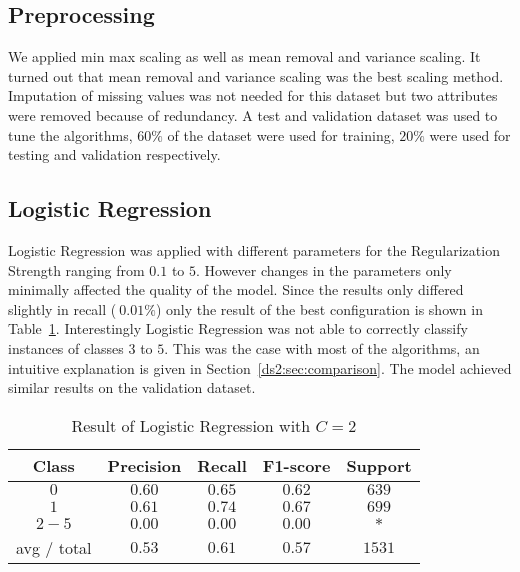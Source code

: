 \subsection{Preprocessing}
We applied min max scaling as well as mean removal and variance scaling. It turned out that mean removal and variance scaling was the best scaling method. Imputation of missing values was not needed for this dataset but two attributes were removed because of redundancy. A test and validation dataset was used to tune the algorithms, $60\%$ of the dataset were used for training, $20\%$ were used for testing and validation respectively. 
\subsection{Logistic Regression}
Logistic Regression was applied with different parameters for the Regularization Strength ranging from $0.1$ to $5$. However changes in the parameters only minimally affected the quality of the model. Since the results only differed slightly in recall ($~0.01\%$) only the result of the best configuration is shown in Table~\ref{ds2:table:lr}. Interestingly Logistic Regression was not able to correctly classify instances of classes $3$ to $5$. This was the case with most of the algorithms, an intuitive explanation is given in Section~\ref{ds2:sec:comparison}. The model achieved similar results on the validation dataset.

\begin{table}[p]
\begin{center}
\begin{tabular}{|c|c|c|c|c|}
\hline Class & Precision & Recall & F1-score & Support \\
\hline  $0$    &   $0.60$    & $ 0.65$  &   $ 0.62$  &     $639$ \\
\hline  $1$    &   $0.61$    &  $0.74$  &   $ 0.67$  &     $699$ \\
\hline  $2-5$  &   $0.00$    &  $0.00$  &    $0.00$  &     $*$ \\
\hline avg / total &      $0.53$  &    $0.61$  &    $0.57$  &   $1531$\\
\hline
\end{tabular}

\caption{Result of Logistic Regression with $C=2$}
\label{ds2:table:lr}
\end{center}
\end{table}


